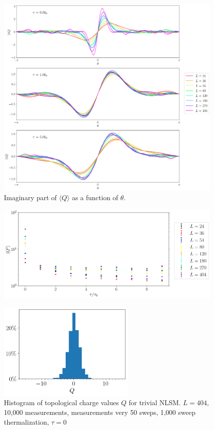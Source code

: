 \documentclass[12pt]{report}
\begin{document}
\begin{figure}[h]
    \centering
      \includegraphics[width=\textwidth]{imgs/theta.png}
      \caption{\label{fig:theta} Imaginary part of $\langle Q \rangle$ as a function of $\theta$.}
\end{figure}

\begin{figure}[h]
    \centering
      \includegraphics[width=\textwidth]{imgs/bietenholz.png}
      \caption{\label{fig:bietenholz} }
\end{figure}

\begin{figure}[h]
    \centering
      \includegraphics[width=0.6\textwidth]{imgs/hist.png}
      \caption{\label{fig:hist} Histogram of topological charge values $Q$ for trivial NLSM. $L=404$, 10,000 measurements, measurements very 50 sweps, 1,000 sweep thermalization, $\tau=0$}
\end{figure}
\end{document}
